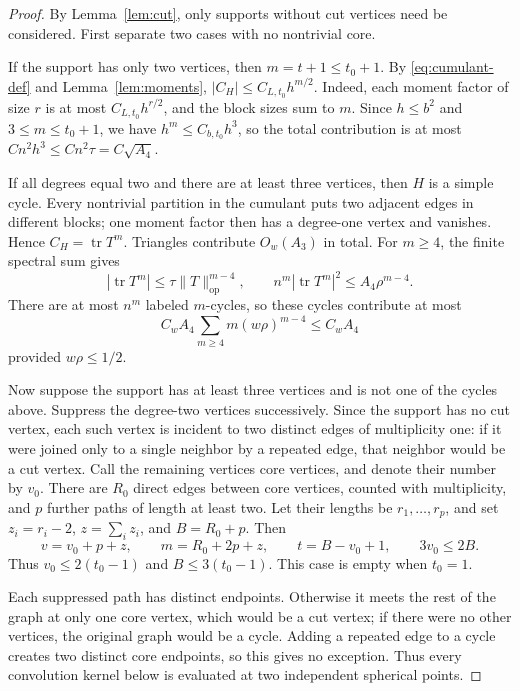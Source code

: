 \documentclass[10pt,a4paper]{amsart}
\DeclareMathOperator{\tr}{tr}
\begin{document}
\begin{proof}
By Lemma~\ref{lem:cut}, only supports without cut vertices need be considered.
First separate two cases with no nontrivial core.

If the support has only two vertices, then $m=t+1\le t_0+1$.
By \eqref{eq:cumulant-def} and Lemma~\ref{lem:moments},
$|C_H|\le C_{L,t_0}h^{m/2}$.
Indeed, each moment factor of size $r$ is at most $C_{L,t_0}h^{r/2}$,
and the block sizes sum to $m$.
Since $h\le b^2$ and $3\le m\le t_0+1$, we have $h^m\le C_{b,t_0}h^3$, so the total contribution is at most
$C n^2h^3\le C n^2\tau=C\sqrt{A_4}$.

If all degrees equal two and there are at least three vertices,
then $H$ is a simple cycle. Every nontrivial partition in the cumulant
puts two adjacent edges in different blocks; one moment factor then has a degree-one vertex and vanishes.
Hence $C_H=\tr T^m$. Triangles contribute $O_w(A_3)$ in total.
For $m\ge4$, the finite spectral sum gives
\[
 |\tr T^m|\le \tau\|T\|_{\mathrm{op}}^{m-4},
 \qquad n^m|\tr T^m|^2\le A_4\rho^{m-4}.
\]
There are at most $n^m$ labeled $m$-cycles, so these cycles contribute at most
\[
 C_w A_4\sum_{m\ge4}m(w\rho)^{m-4}\le C_wA_4
\]
provided $w\rho\le1/2$.

Now suppose the support has at least three vertices and is not one of the cycles above.
Suppress the degree-two vertices successively. Since the support has no cut vertex,
each such vertex is incident to two distinct edges of multiplicity one: if it were joined only to a single neighbor by a repeated edge,
that neighbor would be a cut vertex. Call the remaining vertices core vertices, and denote their number by $v_0$.
There are $R_0$ direct edges between core vertices, counted with multiplicity, and $p$ further paths
of length at least two. Let their lengths be $r_1,\ldots,r_p$,
and set $z_i=r_i-2$, $z=\sum_i z_i$, and $B=R_0+p$.
Then
\begin{equation}\label{eq:core-counts}
 v=v_0+p+z,\qquad m=R_0+2p+z,\qquad
 t=B-v_0+1,\qquad 3v_0\le2B.
\end{equation}
Thus $v_0\le2(t_0-1)$ and $B\le3(t_0-1)$.
This case is empty when $t_0=1$.

Each suppressed path has distinct endpoints. Otherwise it meets the rest of the graph at only one core vertex,
which would be a cut vertex; if there were no other vertices, the original graph would be a cycle.
Adding a repeated edge to a cycle creates two distinct core endpoints, so this gives no exception.
Thus every convolution kernel below is evaluated at two independent spherical points.


\end{proof}
\end{document}
